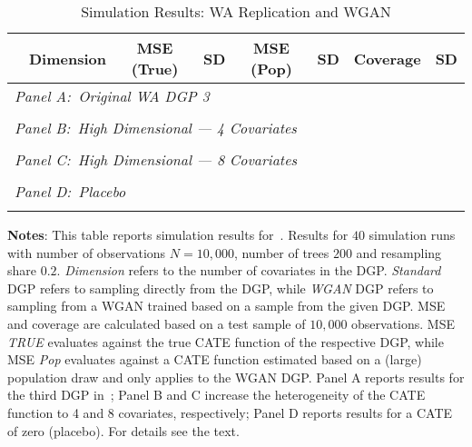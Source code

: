 \documentclass[11pt, a4paper, leqno]{article}
\begin{document}
\begin{table}
    \caption{Simulation Results: WA Replication and WGAN}
    \begin{threeparttable}
        \center
        \begin{tabular}{lccccccc}
            & Dimension & MSE (True) & SD & MSE (Pop) & SD & Coverage & SD \\
            \toprule
            \multicolumn{8}{l}{\textit{Panel A:\ Original WA DGP 3}} \\
             \\
            \midrule

            \multicolumn{8}{l}{\textit{Panel B:\ High Dimensional --- 4 Covariates}} \\
             \\
            \midrule

            \multicolumn{8}{l}{\textit{Panel C:\ High Dimensional --- 8 Covariates}} \\
             \\
            \midrule

            \multicolumn{8}{l}{\textit{Panel D:\ Placebo}} \\
             \\
            \bottomrule
        \end{tabular}
        \begin{tablenotes}
            \small
            \item \textbf{Notes}: This table reports simulation results for~\cite{wager2018estimation}.
            Results for $40$ simulation runs with number of observations $N=10,000$, number of trees $200$ and resampling share $0.2$.
            \textit{Dimension} refers to the number of covariates in the DGP\@. \textit{Standard} DGP refers to sampling directly from the DGP, while \textit{WGAN} DGP refers to sampling from a WGAN trained based on a sample from the given DGP.
            MSE and coverage are calculated based on a test sample of $10,000$ observations. MSE \textit{TRUE} evaluates against the true CATE function of the respective DGP, while MSE \textit{Pop} evaluates against a CATE function estimated based on a (large) population draw and only applies to the WGAN DGP.
            Panel A reports results for the third DGP in~\cite{wager2018estimation}; Panel B and C increase the heterogeneity of the CATE function to 4 and 8 covariates, respectively; Panel D reports results for a CATE of zero (placebo).
            For details see the text.
        \end{tablenotes}
    \end{threeparttable}
\end{table}
\end{document}
